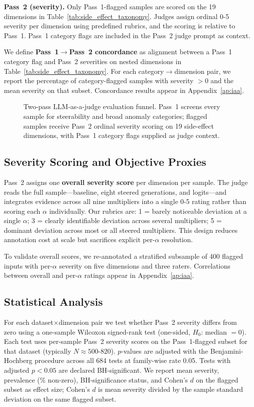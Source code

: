 \textbf{Pass~2 (severity).}
Only Pass~1-flagged samples are scored on the 19 dimensions in Table~\ref{tab:side_effect_taxonomy}.
Judges assign ordinal 0-5 severity per dimension using predefined rubrics, and the scoring is relative to Pass~1.
Pass~1 category flags are included in the Pass~2 judge prompt as context.

We define \textbf{Pass~1$\to$Pass~2 concordance} as alignment between a Pass~1 category flag and Pass~2 severities on nested dimensions in Table~\ref{tab:side_effect_taxonomy}.
For each category$\to$dimension pair, we report the percentage of category-flagged samples with severity $> 0$ and the mean severity on that subset.
Concordance results appear in Appendix~\ref{ap:iaa}.

\begin{figure}[htbp]
  \centering
  
  \caption{Two-pass LLM-as-a-judge evaluation funnel. Pass~1 screens every sample for steerability and broad anomaly categories; flagged samples receive Pass~2 ordinal severity scoring on 19 side-effect dimensions, with Pass~1 category flags supplied as judge context.}
  \label{fig:two_pass_judge_pipeline}
\end{figure}

\subsection{Severity Scoring and Objective Proxies}
Pass~2 assigns one \textbf{overall severity score} per dimension per sample.
The judge reads the full sample---baseline, eight steered generations, and logits---and integrates evidence across all nine multipliers into a single 0-5 rating rather than scoring each $\alpha$ individually.
Our rubrics are: 1 = barely noticeable deviation at a single $\alpha$; 3 = clearly identifiable deviation across several multipliers; 5 = dominant deviation across most or all steered multipliers.
This design reduces annotation cost at scale but sacrifices explicit per-$\alpha$ resolution.

To validate overall scores, we re-annotated a stratified subsample of 400 flagged inputs with per-$\alpha$ severity on five dimensions and three raters.
Correlations between overall and per-$\alpha$ ratings appear in Appendix~\ref{ap:iaa}.

\subsection{Statistical Analysis}\label{sec:Statistical Analysis}
For each dataset$\times$dimension pair we test whether Pass~2 severity differs from zero using a one-sample Wilcoxon signed-rank test (one-sided, $H_0$: median $=0$).
Each test uses per-sample Pass~2 severity scores on the Pass~1-flagged subset for that dataset (typically $N \approx 500$-$820$).
$p$-values are adjusted with the Benjamini-Hochberg procedure across all 684 tests at family-wise rate 0.05.
Tests with adjusted $p < 0.05$ are declared BH-significant.
We report mean severity, prevalence (\% non-zero), BH-significance status, and Cohen's $d$ on the flagged subset as effect size; Cohen's $d$ is mean severity divided by the sample standard deviation on the same flagged subset.

